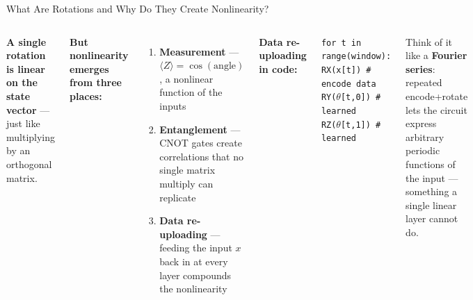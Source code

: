 \documentclass[aspectratio=169,professionalfonts]{beamer}
\begin{document}
\begin{frame}{What Are Rotations and Why Do They Create Nonlinearity?}
\begin{columns}[T]
\textbf{A single rotation is linear on the state vector} --- just like multiplying by an orthogonal matrix.

\vspace{0.5em}
\textbf{But nonlinearity emerges from three places:}
\begin{enumerate}
  \item \textbf{Measurement} --- $\langle Z \rangle = \cos(\text{angle})$, a nonlinear function of the inputs
  \item \textbf{Entanglement} --- CNOT gates create correlations that no single matrix multiply can replicate
  \item \textbf{Data re-uploading} --- feeding the input $x$ back in at every layer compounds the nonlinearity
\end{enumerate}

\textbf{Data re-uploading in code:}

\vspace{0.3em}
\texttt{\small for t in range(window):}\\
\texttt{\small \quad RX(x[t]) \# encode data}\\
\texttt{\small \quad RY($\theta$[t,0]) \# learned}\\
\texttt{\small \quad RZ($\theta$[t,1]) \# learned}

\vspace{0.5em}
Think of it like a \textbf{Fourier series}: repeated encode+rotate lets the circuit express arbitrary periodic functions of the input --- something a single linear layer cannot do.
\end{columns}
\end{frame}
\end{document}
